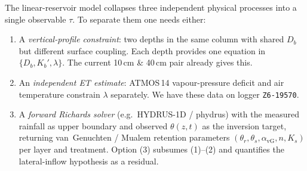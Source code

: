 \documentclass[11pt]{article}
\begin{document}
The linear-reservoir model collapses three independent physical
processes into a single observable $\tau$. To separate them one
needs either:
\begin{enumerate}
\item A \emph{vertical-profile constraint}: two depths in the same
      column with shared $D_b$ but different surface coupling. Each
      depth provides one equation in $\{D_b, K_b', \lambda\}$. The
      current 10\,cm \& 40\,cm pair already gives this.
\item An \emph{independent ET estimate}: ATMOS\,14 vapour-pressure
      deficit and air temperature constrain $\lambda$ separately. We
      have these data on logger \texttt{Z6-19570}.
\item A \emph{forward Richards solver} (e.g.\ HYDRUS-1D / phydrus)
      with the measured rainfall as upper boundary and observed
      $\theta(z,t)$ as the inversion target, returning
      van~Genuchten / Mualem retention parameters $(\theta_r,
      \theta_s, \alpha_\text{vG}, n, K_s)$ per layer and treatment.
      Option (3) subsumes (1)--(2) and quantifies the lateral-inflow
      hypothesis as a residual.
\end{enumerate}
\end{document}
